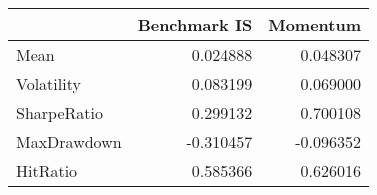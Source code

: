 \begin{tabular}{lrr}
\toprule
{} &  Benchmark IS &  Momentum \\
\midrule
Mean        &      0.024888 &  0.048307 \\
Volatility  &      0.083199 &  0.069000 \\
SharpeRatio &      0.299132 &  0.700108 \\
MaxDrawdown &     -0.310457 & -0.096352 \\
HitRatio    &      0.585366 &  0.626016 \\
\bottomrule
\end{tabular}
